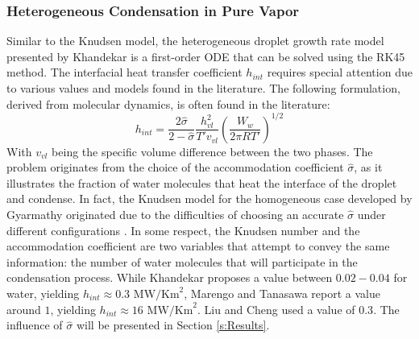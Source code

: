 \documentclass[12pt]{article}
\numberwithin{equation}{section}
\begin{document}
\subsubsection{Heterogeneous Condensation in Pure Vapor}\label{sss:Methodology-Droplet-het}
Similar to the Knudsen model, the heterogeneous droplet growth rate model presented by Khandekar \cite{khandekar2020drop} is a first-order ODE that can be solved using the RK45 method. The interfacial heat transfer coefficient $h_{int}$ requires special attention due to various values and models found in the literature. The following formulation, derived from molecular dynamics, is often found in the literature:
\begin{equation}
    h_{int}=\frac{2\hat{\sigma}}{2-\hat{\sigma}}\frac{h_{vl}^{2}}{T'v_{vl}}\left(\frac{W_{w}}{2\pi R T'}\right)^{1/2}
\end{equation}
With $v_{vl}$ being the specific volume difference between the two phases. The problem originates from the choice of the accommodation coefficient $\hat{\sigma}$, as it illustrates the fraction of water molecules that heat the interface of the droplet and condense. In fact, the Knudsen model for the homogeneous case developed by Gyarmathy \cite{gyarmathy1962grundlagen} originated due to the difficulties of choosing an accurate $\hat{\sigma}$ under different configurations \cite{gerber2004pressure}. In some respect, the Knudsen number and the accommodation coefficient are two variables that attempt to convey the same information: the number of water molecules that will participate in the condensation process. While Khandekar proposes a value between $0.02-0.04$ for water, yielding $h_{int}\approx 0.3$ $\mathrm{MW/Km}^2$, Marengo and Tanasawa \cite{marengo2022surface} \cite{tanasawa1991advances} report a value around $1$, yielding $h_{int}\approx 16$ $\mathrm{MW/Km}^2$. Liu and Cheng \cite{liu2015dropwise} used a value of $0.3$. The influence of $\hat{\sigma}$ will be presented in Section \ref{s:Results}.
\end{document}
